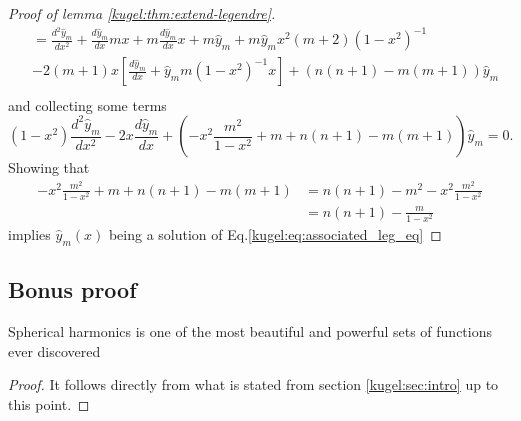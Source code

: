 \begin{proof}[Proof of lemma \ref{kugel:thm:extend-legendre}]
\begin{align*}
    &= \frac{d^2\hat{y}_m}{dx^2} + \frac{d\hat{y}_m}{dx}mx + m\frac{d\hat{y}_m}{dx}x + m\hat{y}_m + m\hat{y}_m x^2(m+2)(1-x^2)^{-1} \\
    &-2(m+1)x\left[  \frac{d\hat{y}_m}{dx} + \hat{y}_mm(1-x^2)^{-1}x \right] + (n(n+1)-m(m+1))\hat{y}_m\\
  \end{align*}
  and collecting some terms
  \begin{equation*}
    (1-x^2)\frac{d^2\hat{y}_m}{dx^2} - 2x\frac{d\hat{y}_m}{dx} + \left( -x^2 \frac{m^2}{1-x^2} + m+n(n+1)-m(m+1)\right)\hat{y}_m=0.
  \end{equation*}
  Showing that 
  \begin{align*}
    -x^2 \frac{m^2}{1-x^2} + m+n(n+1)-m(m+1) &= n(n+1)- m^2 -x^2 \frac{m^2}{1-x^2} \\
    &= n(n+1)- \frac{m}{1-x^2}
  \end{align*}
  implies $\hat{y}_m(x)$ being a solution of Eq.\eqref{kugel:eq:associated_leg_eq}
\end{proof}

\subsection{Bonus proof}
\begin{theorem}
  Spherical harmonics is one of the most beautiful and powerful sets of functions ever discovered
\end{theorem}
\begin{proof}
  It follows directly from what is stated from section \ref{kugel:sec:intro} up to this point.
\end{proof}
